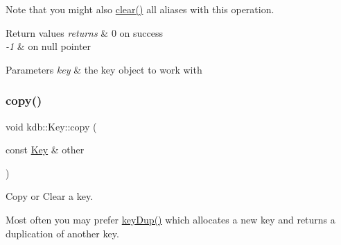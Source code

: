\begin{DoxyNote}{Note}
that you might also \mbox{\hyperlink{classkdb_1_1Key_a33a112681b0b2e94e6d369c0f89e361b}{clear()}} all aliases with this operation.
\end{DoxyNote}

\begin{DoxyCode}{0}
\DoxyCodeLine{\{}
\DoxyCodeLine{        \textcolor{comment}{// you have a fresh key k here}}
\DoxyCodeLine{        \textcolor{comment}{// the caller will get an empty key k with an value}}
\DoxyCodeLine{\}}
\end{DoxyCode}



\begin{DoxyRetVals}{Return values}
{\em returns} & 0 on success \\
\hline
{\em -\/1} & on null pointer\\
\hline
\end{DoxyRetVals}

\begin{DoxyParams}{Parameters}
{\em key} & the key object to work with \\
\hline
\end{DoxyParams}
\mbox{\label{classkdb_1_1Key_ab5bc93e22f4cf40b9d2b1fc32cc260be}} 
\subsubsection{\texorpdfstring{copy()}{copy()}}
{\footnotesize\ttfamily void kdb\+::\+Key\+::copy (\begin{DoxyParamCaption}\item[{const \mbox{\hyperlink{classkdb_1_1Key}{Key}} \&}]{other }\end{DoxyParamCaption})\hspace{0.3cm}{\ttfamily [inline]}}



Copy or Clear a key. 

Most often you may prefer \mbox{\hyperlink{group__key_gae6ec6a60cc4b8c1463fa08623d056ce3}{key\+Dup()}} which allocates a new key and returns a duplication of another key.

